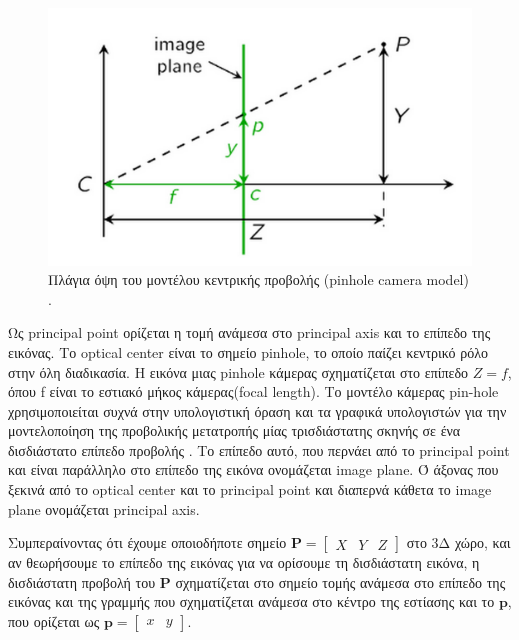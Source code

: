 \begin{figure}[H]
    \centering
    \includegraphics[scale=0.5, angle=0]{Files/Figures/pinhole2.png}
    \caption[Πλάγια όψη του μοντέλου κεντρικής προβολής 2D (pinhole camera model)]{ Πλάγια όψη του μοντέλου κεντρικής προβολής (pinhole camera model) \cite{pinhole} .}
    \label{fig:pinhole2}
\end{figure}

Ως principal point ορίζεται η τομή ανάμεσα στο principal axis και το επίπεδο της εικόνας. Το optical center είναι το σημείο pinhole, το οποίο παίζει κεντρικό ρόλο στην όλη διαδικασία. Η εικόνα μιας pinhole κάμερας σχηματίζεται στο επίπεδο $Z=f$, όπου f είναι το εστιακό μήκος κάμερας(focal length).
Το μοντέλο κάμερας pin-hole χρησιμοποιείται συχνά στην υπολογιστική όραση και τα γραφικά υπολογιστών για την μοντελοποίηση της προβολικής μετατροπής μίας τρισδιάστατης σκηνής σε ένα δισδιάστατο επίπεδο προβολής \cite{hartley2003multiple} .
Το επίπεδο αυτό, που περνάει από το principal point και είναι παράλληλο στο επίπεδο της εικόνα ονομάζεται image plane.
Ό άξονας που ξεκινά από το optical center και το principal point και διαπερνά κάθετα το image plane ονομάζεται principal axis.


Συμπεραίνοντας ότι έχουμε οποιοδήποτε σημείο $\mathbf{P} = \begin{bmatrix}X & Y &Z\end{bmatrix}$ στο 3Δ χώρο, και αν θεωρήσουμε το επίπεδο της εικόνας για να ορίσουμε τη δισδιάστατη εικόνα, η δισδιάστατη προβολή του $\mathbf{P}$ σχηματίζεται στο σημείο τομής ανάμεσα στο επίπεδο της εικόνας και της γραμμής που σχηματίζεται ανάμεσα στο κέντρο της εστίασης και το $\mathbf{p}$, που ορίζεται ως  $\mathbf{p} = \begin{bmatrix}x & y\end{bmatrix}$. 





